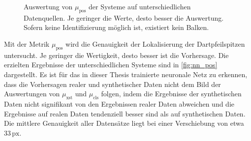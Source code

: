 \begin{figure}
    \centering
    \caption{Auswertung von $\mu_\text{pos}$ der Systeme auf unterschiedlichen Datenquellen. Je geringer die Werte, desto besser die Auswertung. Sofern keine Identifizierung möglich ist, existiert kein Balken.}
    \label{fig:nn_pos}
\end{figure}

Mit der Metrik $\mu_\text{pos}$ wird die Genauigkeit der Lokalisierung der Dartpfeilspitzen untersucht. Je geringer die Wertigkeit, desto besser ist die Vorhersage. Die erzielten Ergebnisse der unterschiedlichen Systeme sind in \autoref{fig:nn_pos} dargestellt. Es ist für das in dieser Thesis trainierte neuronale Netz zu erkennen, dass die Vorhersagen realer und synthetischer Daten nicht dem Bild der Auswertungen von $\mu_\text{xst}$ und $\mu_\text{cls}$ folgen, indem die Ergebnisse der synthetischen Daten nicht signifikant von den Ergebnissen realer Daten abweichen und die Ergebnisse auf realen Daten tendenziell besser sind als auf synthetischen Daten. Die mittlere Genauigkeit aller Datensätze liegt bei einer Verschiebung von etwa $33\,\text{px}$.

